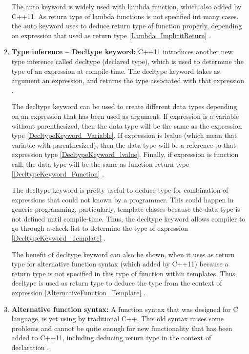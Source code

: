 \documentclass[11pt]{report}
\begin{document}
\begin{enumerate}
The auto keyword is widely used with lambda function, which also added by C++11. As return type of lambda functions is not specified int many cases, the auto keyword uses to deduce return type of function properly, depending on expression that used as return type \ref{Lambda_ImplicitReturn} \cite{Gregorie:professionalcpp}.

\item \textbf{Type inference – Decltype keyword:} C++11 introduces another new type inference called decltype (declared type), which is used to determine the type of an expression at compile-time. The decltype keyword takes as argument an expression, and returns the type associated with that expression \cite{Stroustrup:2012:Cpp11}. 
\newline

The decltype keyword can be used to create different data types depending on an expression that has been used as argument.  If expression is a variable without parenthesized, then the data type will be the same as the expression type \ref{DecltypeKeyword_Variable}. If expression is lvalue (which mean that variable with parenthesized), then the data type will be a reference to that expression type \ref{DecltypeKeyword_lvalue}. Finally, if expression is function call, the data type will be the same as function return type \ref{DecltypeKeyword_Function} \cite{Prata:2012:Cpp}.
\newline

The decltype keyword is pretty useful to deduce type for combination of expressions that could not known by a programmer. This could happen in generic programming, particularly, template classes because the data type is not defined until compile-time. Thus, the decltype keyword allows compiler to go through a check-list to determine the type of expression \ref{DecltypeKeyword_Template} \cite{Stroustrup:2012:Cpp11}.
\newline

The benefit of decltype keyword can also be shown, when it uses as return type for alternative function syntax (which added by C++11) because a return type is not specified in this type of function within templates. Thus, decltype is used as return type to deduce the type from the context of expression \ref{AlternativeFunction_Template} \cite{Gregorie:professionalcpp}. 

\item \textbf{Alternative function syntax:} A function syntax that was designed for C language, is yet using by traditional C++. This old syntax raises some problems and cannot be quite enough for new functionality that has been added to C++11, including deducing return type in the context of declaration \cite{Gregorie:professionalcpp}.
\newline


\end{enumerate}
\end{document}
